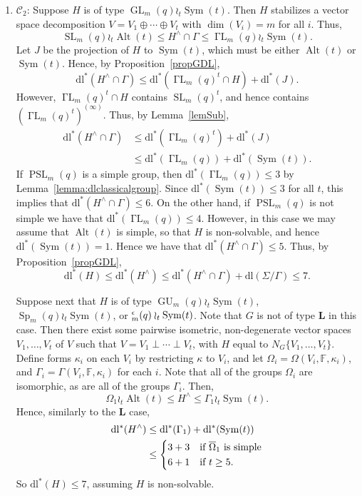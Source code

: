 \documentclass[11pt]{amsart}
\numberwithin{equation}{section}
\theoremstyle{definition}
\theoremstyle{remark}
\newcommand{\Sym}{\mathop{\mathrm{Sym}}}
\newcommand{\Alt}{\mathop{\mathrm{Alt}}}
\DeclareMathOperator{\GL}{GL}
\DeclareMathOperator{\SL}{SL}
\newcommand{\dll}{\mathrm{dl^*}}
\newcommand{\dl}{\mathrm{dl}}
\newcommand{\boldL}{\mathbf{L}}
\DeclareMathOperator{\GammaL}{\Gamma L}
\DeclareMathOperator{\PSL}{PSL}
\DeclareMathOperator{\GU}{GU}
\newcommand{\boldS}{\mathbf{S}}
\DeclareMathOperator{\Sp}{Sp}
\let\O\relax
\DeclareMathOperator{\O}{O}
\begin{document}
\begin{enumerate}
    Finally, if $H$ is of type $\Sp_{n-2}(q)$ then $H$ is a classical group of type $\boldS$, and so $\dll(H) \leq 3$.
    
    \item $\mathscr C_2$: Suppose $H$ is of type $\GL_m(q) \wr_t \Sym(t)$. Then $H$ stabilizes a vector space decomposition $V=V_1 \oplus \cdots \oplus V_t$ with $\dim(V_i) = m$ for all $i$. Thus,
    \[
        \SL_m(q) \wr_t \Alt(t) \leqslant H^{\wedge} \cap \Gamma \leqslant
        \GammaL_m(q) \wr_t \Sym(t).
    \]
    Let $J$ be the projection of $H$ to $\Sym(t)$, which must be either $\Alt(t)$ or $\Sym(t)$. Hence, by Proposition~\ref{propGDL},
    \[
        \dll(H^\wedge \cap \Gamma) \leq \dll(\GammaL_m(q)^t \cap H) + \dll(J).
    \]
    However, $\GammaL_m(q)^t \cap H$ contains $\SL_m(q)^t$, and hence contains $(\GammaL_m(q)^t)^{(\infty)}$. Thus, by Lemma~\ref{lemSub},
    \begin{align*}
        \dll(H^\wedge \cap \Gamma) & \leq \dll(\GammaL_m(q)^t) + \dll(J) \\
        & \leq \dll(\GammaL_m(q)) + \dll(\Sym(t)).
    \end{align*}
    If $\PSL_m(q)$ is a simple group, then $\dll(\GammaL_m(q)) \leq 3$ by Lemma~\ref{lemma:dlclassicalgroup}. Since $\dll(\Sym(t)) \leq 3$ for all $t$, this implies that $\dll(H^{\wedge} \cap \Gamma) \leq 6$. On the other hand, if $\PSL_m(q)$ is not simple we have that $\dll(\GammaL_m(q)) \leq 4$. However, in this case we may assume that $\Alt(t)$ is simple, so that $H$ is non-solvable, and hence $\dll(\Sym(t)) = 1$. Hence we have that $\dll(H^\wedge \cap \Gamma) \leq 5$. Thus, by Proposition~\ref{propGDL},
    \[
        \dll(H) \leq \dll(H^{\wedge}) \leq \dll(H^{\wedge} \cap \Gamma) + \dl(\Sigma/\Gamma) \leq 7.
    \]

    Suppose next that $H$ is of type $\GU_m(q) \wr_t \Sym(t)$, $\Sp_m(q)\wr_t \Sym(t)$, or $\O_m^\epsilon(q) \wr_t \Sym(t)$. Note that $G$ is not of type $\boldL$ in this case. Then there exist some pairwise isometric, non-degenerate vector spaces $V_1, \dots, V_t$ of $V$ such that $V = V_1 \perp \cdots \perp V_t$, with $H$ equal to $N_G\{V_1, \dots, V_t\}$. Define forms $\kappa_i$ on each $V_i$ by restricting $\kappa$ to $V_i$, and let $\Omega_i = \Omega(V_i, \mathbb F, \kappa_i)$, and $\Gamma_i = \Gamma(V_i, \mathbb F, \kappa_i)$ for each $i$. Note that all of the groups $\Omega_i$ are isomorphic, as are all of the groups $\Gamma_i$. Then,
    \[
        \Omega_1 \wr_t \Alt(t) 
        \leqslant H^{\wedge} \leqslant
        \Gamma_1 \wr_t \Sym(t).
    \]
    Hence, similarly to the $\boldL$ case,
    \begin{align*}
        \dll(H^{\wedge}) & \leq \dll(\Gamma_1) + \dll(\Sym(t)) \\
        & \leq \begin{cases*}
            3 + 3 & if $\overline \Omega_1$ is simple\\
            6 + 1 & if $t \geq 5$.
        \end{cases*}
    \end{align*}
    So $\dll(H) \leq 7$, assuming $H$ is non-solvable.


\end{enumerate}
\end{document}
